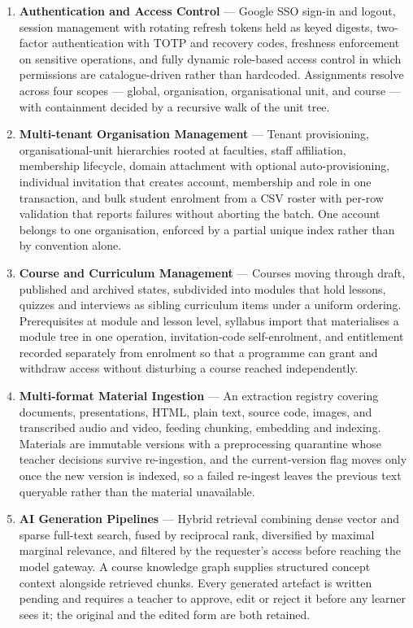 \begin{enumerate}
    \item \textbf{Authentication and Access Control} --- Google SSO sign-in and logout, session management with rotating refresh tokens held as keyed digests, two-factor authentication with TOTP and recovery codes, freshness enforcement on sensitive operations, and fully dynamic role-based access control in which permissions are catalogue-driven rather than hardcoded. Assignments resolve across four scopes --- global, organisation, organisational unit, and course --- with containment decided by a recursive walk of the unit tree.

    \item \textbf{Multi-tenant Organisation Management} --- Tenant provisioning, organisational-unit hierarchies rooted at faculties, staff affiliation, membership lifecycle, domain attachment with optional auto-provisioning, individual invitation that creates account, membership and role in one transaction, and bulk student enrolment from a CSV roster with per-row validation that reports failures without aborting the batch. One account belongs to one organisation, enforced by a partial unique index rather than by convention alone.

    \item \textbf{Course and Curriculum Management} --- Courses moving through draft, published and archived states, subdivided into modules that hold lessons, quizzes and interviews as sibling curriculum items under a uniform ordering. Prerequisites at module and lesson level, syllabus import that materialises a module tree in one operation, invitation-code self-enrolment, and entitlement recorded separately from enrolment so that a programme can grant and withdraw access without disturbing a course reached independently.

    \item \textbf{Multi-format Material Ingestion} --- An extraction registry covering documents, presentations, HTML, plain text, source code, images, and transcribed audio and video, feeding chunking, embedding and indexing. Materials are immutable versions with a preprocessing quarantine whose teacher decisions survive re-ingestion, and the current-version flag moves only once the new version is indexed, so a failed re-ingest leaves the previous text queryable rather than the material unavailable.

    \item \textbf{AI Generation Pipelines} --- Hybrid retrieval combining dense vector and sparse full-text search, fused by reciprocal rank, diversified by maximal marginal relevance, and filtered by the requester's access before reaching the model gateway. A course knowledge graph supplies structured concept context alongside retrieved chunks. Every generated artefact is written pending and requires a teacher to approve, edit or reject it before any learner sees it; the original and the edited form are both retained.


\end{enumerate}
